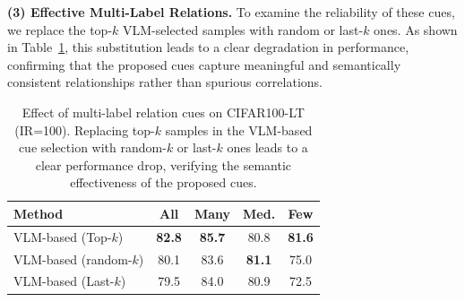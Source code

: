 
\noindent \textbf{(3) Effective  Multi-Label Relations.}
To examine the reliability of these cues, we replace the top-$k$ VLM-selected samples with random or last-$k$ ones. As shown in Table~\ref{tab:multi_label_relation}, this substitution leads to a clear degradation in performance, confirming that the proposed cues capture meaningful and semantically consistent relationships rather than spurious correlations.

\begin{table}[!t]
\centering
\caption{Effect of multi-label relation cues on CIFAR100-LT (IR=100). Replacing top-$k$ samples in the VLM-based cue selection with random-$k$ or last-$k$ ones leads to a clear performance drop, verifying the semantic effectiveness of the proposed cues.}
\vspace{-0.5em}
\label{tab:multi_label_relation}
\begin{tabular}{l|cccc}
\toprule
\textbf{Method} & \textbf{All} & \textbf{Many} & \textbf{Med.} & \textbf{Few} \\
\midrule
VLM-based (Top-$k$) & \textbf{82.8} & \textbf{85.7} & 80.8 & \textbf{81.6} \\
VLM-based (random-$k$) & 80.1 & 83.6 & \textbf{81.1} & 75.0 \\
VLM-based (Last-$k$) & 79.5 & 84.0 & 80.9 & 72.5 \\
\bottomrule
\end{tabular}
\vspace{-1.5em}
\end{table}







